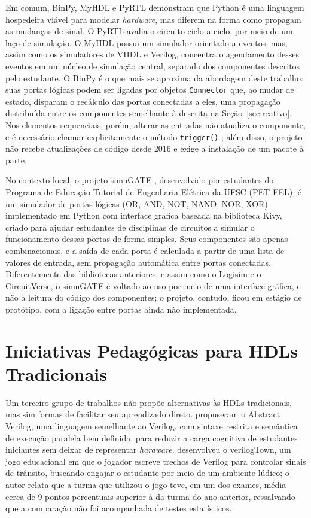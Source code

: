 Em comum, BinPy, MyHDL e PyRTL demonstram que Python é uma linguagem hospedeira viável para modelar \textit{hardware}, mas diferem na forma como propagam as mudanças de sinal. O PyRTL avalia o circuito ciclo a ciclo, por meio de um laço de simulação. O MyHDL possui um simulador orientado a eventos, mas, assim como os simuladores de VHDL e Verilog, concentra o agendamento desses eventos em um núcleo de simulação central, separado dos componentes descritos pelo estudante. O BinPy é o que mais se aproxima da abordagem deste trabalho: suas portas lógicas podem ser ligadas por objetos \texttt{Connector} que, ao mudar de estado, disparam o recálculo das portas conectadas a eles, uma propagação distribuída entre os componentes semelhante à descrita na Seção~\ref{sec:reativo}. Nos elementos sequenciais, porém, alterar as entradas não atualiza o componente, e é necessário chamar explicitamente o método \texttt{trigger()} \cite{binpy}; além disso, o projeto não recebe atualizações de código desde 2016 e exige a instalação de um pacote à parte.

No contexto local, o projeto simuGATE \cite{simugate2020}, desenvolvido por estudantes do Programa de Educação Tutorial de Engenharia Elétrica da UFSC (PET EEL), é um simulador de portas lógicas (OR, AND, NOT, NAND, NOR, XOR) implementado em Python com interface gráfica baseada na biblioteca Kivy, criado para ajudar estudantes de disciplinas de circuitos a simular o funcionamento dessas portas de forma simples. Seus componentes são apenas combinacionais, e a saída de cada porta é calculada a partir de uma lista de valores de entrada, sem propagação automática entre portas conectadas. Diferentemente das bibliotecas anteriores, e assim como o Logisim e o CircuitVerse, o simuGATE é voltado ao uso por meio de uma interface gráfica, e não à leitura do código dos componentes; o projeto, contudo, ficou em estágio de protótipo, com a ligação entre portas ainda não implementada.

\section{Iniciativas Pedagógicas para HDLs Tradicionais}
\label{sec:pedagogia-hdl}

Um terceiro grupo de trabalhos não propõe alternativas às HDLs tradicionais, mas sim formas de facilitar seu aprendizado direto.  propuseram o Abstract Verilog, uma linguagem semelhante ao Verilog, com sintaxe restrita e semântica de execução paralela bem definida, para reduzir a carga cognitiva de estudantes iniciantes sem deixar de representar \textit{hardware}.  desenvolveu o verilogTown, um jogo educacional em que o jogador escreve trechos de Verilog para controlar sinais de trânsito, buscando engajar o estudante por meio de um ambiente lúdico; o autor relata que a turma que utilizou o jogo teve, em um dos exames, média cerca de 9 pontos percentuais superior à da turma do ano anterior, ressalvando que a comparação não foi acompanhada de testes estatísticos.

